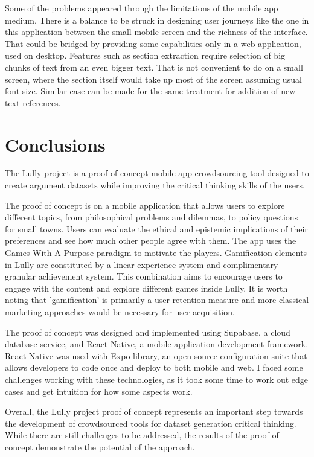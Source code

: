 \documentclass{report}
\begin{document}
Some of the problems appeared through the limitations of the mobile app medium. There is a balance to be struck in designing user journeys like the one in this application between the small mobile screen and the richness of the interface. That could be bridged by providing some capabilities only in a web application, used on desktop. Features such as section extraction require selection of big chunks of text from an even bigger text. That is not convenient to do on a small screen, where the section itself would take up most of the screen assuming usual font size.
Similar case can be made for the same treatment for addition of new text references.

\chapter{Conclusions}

The Lully project is a proof of concept mobile app crowdsourcing tool designed to create argument datasets while improving the critical thinking skills of the users. 

The proof of concept is on a mobile application that allows users to explore different topics, from philosophical problems and dilemmas, to policy questions for small towns. Users can evaluate the ethical and epistemic implications of their preferences and see how much other people agree with them. The app uses the Games With A Purpose paradigm to motivate the players. Gamification elements in Lully are constituted by a linear experience system and complimentary granular achievement system. This combination aims to encourage users to engage with the content and explore different games inside Lully. It is worth noting that 'gamification' is primarily a user retention measure and more classical marketing approaches would be necessary for user acquisition.

The proof of concept was designed and implemented using Supabase, a cloud database service, and React Native, a mobile application development framework. React Native was used with Expo library, an open source configuration suite that allows developers to code once and deploy to both mobile and web. I faced some challenges working with these technologies, as it took some time to work out edge cases and get intuition for how some aspects work.


Overall, the Lully project proof of concept represents an important step towards the development of crowdsourced tools for dataset generation critical thinking. While there are still challenges to be addressed, the results of the proof of concept demonstrate the potential of the approach.


\printbibliography
\end{document}
